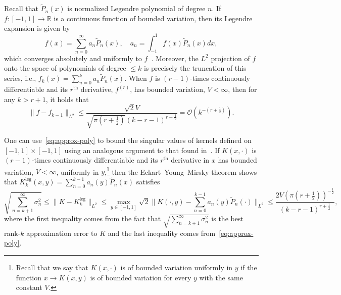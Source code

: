 \documentclass{article}
\begin{document}
Recall that $\tilde{P}_n(x)$ is normalized Legendre polynomial of degree $n$. If $f:[-1,1]\rightarrow\mathbb{R}$ is a continuous function of bounded variation, then its Legendre expansion is given by 
\begin{equation*}
f(x) = \sum_{n=0}^\infty a_n\tilde{P}_n(x), \quad a_n = \int_{-1}^1 f(x) \tilde{P}_n(x) dx,
\end{equation*}
which converges absolutely and uniformly to $f$~\citep{Wang2023}. Moreover, the $L^2$ projection of $f$ onto the space of polynomials of degree $\leq k$ is precisely the truncation of this series, i.e., $f_k(x) = \sum_{n=0}^k a_n\tilde{P}_n(x)$. When $f$ is $(r-1)$-times continuously differentiable and its $r^\text{th}$ derivative, $f^{(r)}$, has bounded variation, $V<\infty$, then for any $k>r+1$, it holds that~\citep[Thm 3.5]{Wang2023}
\begin{equation}\label{eq:approx-poly}
    \|f - f_{k-1}\|_{L^2} \le \frac{\sqrt{2}V}{\sqrt{\pi(r+\frac{1}{2})}(k-r-1)^{r+\frac{1}{2}}} = \mathcal{O}(k^{-(r+\frac{1}{2})}).
\end{equation}

One can use~\cref{eq:approx-poly} to bound the singular values of kernels defined on $[-1,1]\times [-1,1]$ using an analogous argument to that found in~\citep{reade1983eigenvalues}. If $K(x,\cdot)$ is $(r-1)$-times continuously differentiable and its $r^\text{th}$ derivative in $x$ has bounded variation, $V<\infty$, uniformly in $y$,\footnote{Recall that we say that $K(x,\cdot)$ is of bounded variation uniformly in $y$ if the function $x\rightarrow K(x,y)$ is of bounded variation for every $y$ with the same constant $V$.} then the Eckart--Young--Mirsky theorem shows that $K_k^{\text{leg}}(x,y) = \sum_{n=0}^{k-1} a_n(y) \tilde{P}_n(x)$ satisfies
\begin{equation*}
\sqrt{\sum_{n=k+1}^\infty \!\!\!\sigma_n^2}\leq \|K - K_k^{\text{leg}}\|_{L^2}\!\leq \!\!\max_{y\in[-1,1]} \!\!\!\sqrt{2}\|K(\cdot,y) - \sum_{n=0}^{k-1} a_n(y) \tilde{P}_n(\cdot)\|_{L^2}\! \leq \!\frac{2V(\pi (r+\frac{1}{2}))^{-\frac{1}{2}}}{(k-r-1)^{r+\frac{1}{2}}}, 
\end{equation*}
where the first inequality comes from the fact that $\sqrt{\sum_{n=k+1}^\infty \sigma_n^2}$ is the best rank-$k$ approximation error to $K$ and the last inequality comes from~\cref{eq:approx-poly}.  
\end{document}

